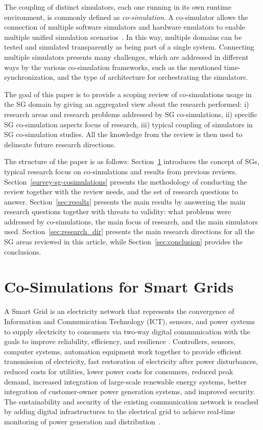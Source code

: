 \documentclass[1p]{elsarticle} %
\begin{document}
The coupling of distinct simulators, each one running in its own runtime environment, is commonly defined as \textit{co-simulation}. A co-simulator allows the connection of multiple software simulators and hardware emulators to enable multiple unified simulation scenarios~\citep{ref:vogt2018survey}. In this way, multiple domains can be tested and simulated transparently as being part of a single system. Connecting multiple simulators presents many challenges, which are addressed in different ways by the various co-simulation frameworks, such as the mentioned time-synchronization, and the type of architecture for orchestrating the simulators. 



The goal of this paper is to provide a scoping review of co-simulations usage in the SG domain by giving an aggregated view about the research performed: i) research areas and research problems addressed by SG co-simulations, ii) specific SG co-simulation aspects focus of research, iii) typical coupling of simulators in SG co-simulation studies. All the knowledge from the review is then used to delineate future research directions.

The structure of the paper is as follows: Section~\ref{sec:intro-simulations-cosimulations} introduces the concept of SGs, typical research focus on co-simulations and results from previous reviews. Section~\ref{survey-sg-cosimulations} presents the methodology of conducting the review together with the review needs, and the set of research questions to answer. Section~\ref{sec:results} presents the main results by answering the main research questions together with threats to validity: what problems were addressed by co-simulations, the main focus of research, and the main simulators used. Section~\ref{sec:research_dir} presents the main research directions for all the SG areas reviewed in this article, while Section~\ref{sec:conclusion} provides the conclusions. 



\section{Co-Simulations for Smart Grids}\label{sec:intro-simulations-cosimulations}

A Smart Grid is an electricity network that represents the convergence of Information and Communication Technology (ICT), sensors, and power systems to supply electricity to consumers via two-way digital communication with the goals to improve reliability, efficiency, and resilience \citep{ref:fang2011smart}. Controllers, sensors, computer systems, automation equipment work together to provide efficient transmission of electricity, fast restoration of electricity after power disturbances, reduced costs for utilities, lower power costs for consumers, reduced peak demand, increased integration of large-scale renewable energy systems, better integration of customer-owner power generation systems, and improved security. The sustainability and security of the existing communication network is reached by adding digital infrastructures to the electrical grid to achieve real-time monitoring of power generation and distribution~\citep{goel2015smart}.
\end{document}
